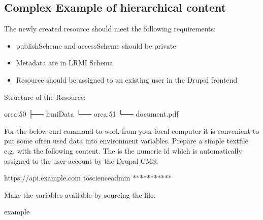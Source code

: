 \documentclass[letterpaper,10pt,english]{sphinxmanual}
\begin{document}
\subsection{Complex Example of hierarchical content}
\label{\detokenize{api-complex-example:complex-example-of-hierarchical-content}}\label{\detokenize{api-complex-example:id1}}\label{\detokenize{api-complex-example::doc}}
\sphinxAtStartPar
The newly created resource should meet the following requirements:
\begin{itemize}
\item {} 
\sphinxAtStartPar
publishScheme and accessScheme should be private

\item {} 
\sphinxAtStartPar
Metadata are in LRMI Schema

\item {} 
\sphinxAtStartPar
Resource should be assigned to an existing user in the Drupal frontend

\end{itemize}

\sphinxAtStartPar
Structure of the Resource:

\begin{sphinxVerbatim}[commandchars=\\\{\}]
orca:50
├── lrmiData
└── orca:51
     └── document.pdf
\end{sphinxVerbatim}

\sphinxAtStartPar
For the below curl command to work from your local computer it is convenient to put some often used data
into environment variables. Prepare a simple textfile e.g.  with the following content. The
 is the numeric id which is automatically assigned to the user account by the Drupal CMS.

\begin{sphinxVerbatim}[commandchars=\\\{\}]
 https://api.example.com
 
 toscience\PYGZhy{}admin
 ***********
\end{sphinxVerbatim}

\sphinxAtStartPar
Make the variables available by sourcing the file:

\begin{sphinxVerbatim}[commandchars=\\\{\}]
\PYGZdl{}  example
\end{sphinxVerbatim}
\end{document}
